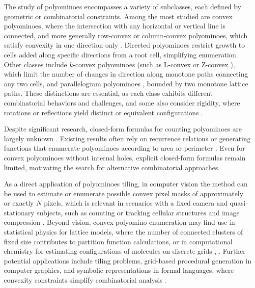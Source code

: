 \documentclass{article}
\theoremstyle{definition}
\theoremstyle{plain}
\begin{document}
The study of polyominoes encompasses a variety of subclasses, each defined 
by geometric or combinatorial constraints. Among the most studied are 
convex polyominoes, where the intersection with any horizontal or vertical 
line is connected, and more generally row-convex or column-convex 
polyominoes, which satisfy convexity in one direction only 
\cite{Del_Lungo_Duchi_Frosini_Rinaldi_2004}. Directed polyominoes restrict 
growth to cells added along specific directions from a root cell, 
simplifying enumeration. Other classes include $k$-convex polyominoes 
(such as L-convex \cite{CASTIGLIONE20071724} or Z-convex 
\cite{DUCHI200854}), which limit the number of changes in direction along 
monotone paths connecting any two cells, and parallelogram polyominoes 
\cite{DELEST1995503}, bounded by two monotone lattice paths. These 
distinctions are essential, as each class exhibits different combinatorial 
behaviors and challenges, and some also consider rigidity, where rotations 
or reflections yield distinct or equivalent configurations 
\cite{LEROUX1998343}.

Despite significant research, closed-form formulas for counting polyominoes 
are largely unknown \cite{bousquetmelou1999polyominoes}. Existing results 
often rely on recurrence relations or generating functions that enumerate 
polyominoes according to area or perimeter \cite{FERETIC1998173}. Even for 
convex polyominoes without internal holes, explicit closed-form formulas 
remain limited, motivating the search for alternative combinatorial 
approaches.

As a direct application of polyominoes tiling, in computer vision the 
method can be used to estimate or enumerate possible convex pixel masks of 
approximately or exactly $N$ pixels, which is relevant in scenarios with a 
fixed camera and quasi-stationary subjects, such as counting or tracking 
cellular structures and image compression 
\cite{10.1007/978-3-642-10210-3_18}. Beyond vision, convex polyomino 
enumeration may find use in statistical physics for lattice models, where 
the number of connected clusters of fixed size contributes to partition 
function calculations, or in computational chemistry for estimating 
configurations of molecules on discrete grids \cite{guttmann2009history}, 
\cite{gheorghe2008computing}. Further potential applications include tiling 
problems, grid-based procedural generation in computer graphics, and 
symbolic representations in formal languages, where convexity constraints 
simplify combinatorial analysis \cite{golomb1970tiling}.
\end{document}

